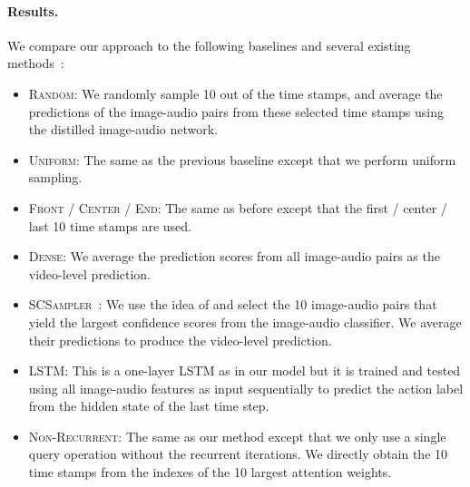\paragraph{Results.} We compare our approach to the following baselines and several existing methods~\cite{yeung2016end,fan2018watching,wu2019adaframe,wu2019multiagent,korbar2019scsampler}:
\vspace{-0.05in}
\begin{itemize}[leftmargin=4mm]
\itemsep0em
\item \textsc{Random:} We randomly sample 10 out of the  time stamps, and average the predictions of the image-audio pairs from these selected time stamps using the distilled image-audio network.
\vspace{-0.05in}
\item \textsc{Uniform:} The same as the previous baseline except that we perform uniform sampling.
\vspace{-0.05in}
\item \textsc{Front / Center / End:} The same as before except that the first / center / last 10 time stamps are used.
\vspace{-0.05in}
\item \textsc{Dense:} We average the prediction scores from all  image-audio pairs as the video-level prediction.
\vspace{-0.05in}
\item \textsc{SCSampler~\cite{korbar2019scsampler}:} We use the idea of \cite{korbar2019scsampler} and select the 10 image-audio pairs that yield the largest confidence scores from the image-audio classifier. We average their predictions to produce the video-level prediction. 
\vspace{-0.05in}
\item \textsc{LSTM}: This is a one-layer LSTM as in our model but it is trained and tested using all  image-audio features as input sequentially to predict the action label from the hidden state of the last time step.
\vspace{-0.05in}
\item \textsc{Non-Recurrent}: The same as our method except that we only use a single query operation without the recurrent iterations. We directly obtain the 10 time stamps from the indexes of the 10 largest attention weights.
\vspace{-0.05in}
\end{itemize}

